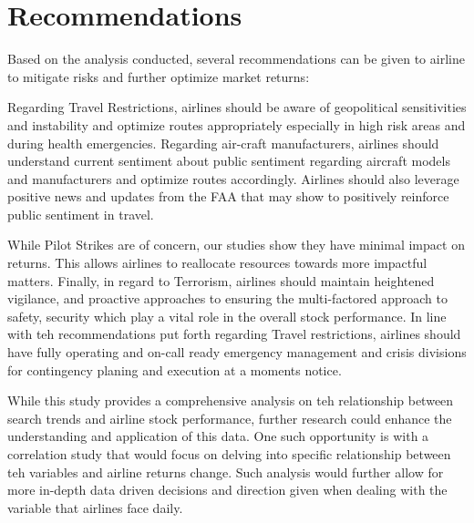 \documentclass[12pt]{report}
\begin{document}
\section*{Recommendations}
Based on the analysis conducted, several recommendations can be given to airline to mitigate risks and further optimize market returns:

Regarding Travel Restrictions, airlines should be aware of geopolitical sensitivities and  instability and optimize routes appropriately especially in high risk areas and during health emergencies.
Regarding air-craft manufacturers, airlines should understand current sentiment about public sentiment  regarding aircraft models and manufacturers and optimize routes accordingly.
Airlines should also leverage positive news and updates from the FAA that may show to positively reinforce public sentiment in travel.

While Pilot Strikes are of concern, our studies show they have minimal impact on returns.
This allows airlines to reallocate resources towards more impactful matters.
Finally, in regard to Terrorism, airlines should maintain heightened vigilance, and proactive approaches to ensuring the multi-factored approach to safety, security which play a vital role in the overall stock performance.
In line with teh recommendations put forth regarding Travel restrictions, airlines should have fully operating and on-call ready emergency management and crisis divisions for contingency planing and execution at a moments notice.

\par
While this study provides a comprehensive analysis on teh relationship between search trends and airline stock performance, further research could enhance the understanding and application of this data.
One such opportunity is with a correlation study that would focus on delving into specific relationship between teh variables and airline returns change.
Such analysis would further allow for more in-depth data driven decisions and direction given when dealing with the variable that airlines face daily.

\newpage



    
\end{document}
